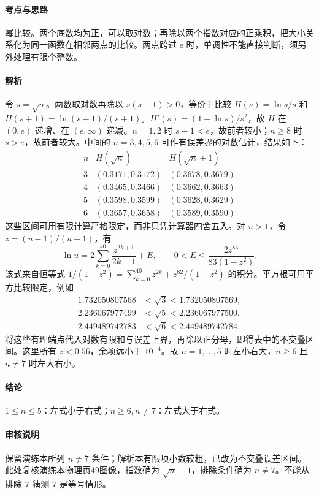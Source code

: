 \documentclass[UTF8,fontset=fandol,12pt,oneside,openany]{ctexrep}
\newcommand{\ee}{\mathrm e}
\theoremstyle{definition}
\begin{document}
\paragraph{考点与思路}
幂比较。两个底数均为正，可以取对数；再除以两个指数对应的正乘积，把大小关系化为同一函数在相邻两点的比较。两点跨过 $\ee$ 时，单调性不能直接判断，须另外处理有限个整数。
\paragraph{解析}
令 $s=\sqrt n$。两数取对数再除以 $s(s+1)>0$，等价于比较 $H(s)=\ln s/s$ 和 $H(s+1)=\ln(s+1)/(s+1)$。$H'(s)=(1-\ln s)/s^2$，故 $H$ 在 $(0,e)$ 递增、在 $(e,\infty)$ 递减。$n=1,2$ 时 $s+1<e$，故前者较小；$n\ge8$ 时 $s>e$，故前者较大。中间的 $n=3,4,5,6$ 可作有误差界的对数估计，结果如下：
\[\begin{array}{c|cc}n&H(\sqrt n)&H(\sqrt n+1)\\\hline3&(0.3171,0.3172)&(0.3678,0.3679)\\4&(0.3465,0.3466)&(0.3662,0.3663)\\5&(0.3598,0.3599)&(0.3628,0.3629)\\6&(0.3657,0.3658)&(0.3589,0.3590)\end{array}\]
这些区间可用有限计算严格限定，而非只凭计算器四舍五入。对 $u>1$，令 $z=(u-1)/(u+1)$，有
\[\ln u=2\sum_{k=0}^{40}\frac{z^{2k+1}}{2k+1}+E,\qquad
0<E\le\frac{2z^{83}}{83(1-z^2)}.\]
该式来自恒等式 $1/(1-z^2)=\sum_{k=0}^{40}z^{2k}+z^{82}/(1-z^2)$ 的积分。平方根可用平方比较限定，例如
\begin{align*}
1.732050807568&<\sqrt3<1.732050807569,\\
2.236067977499&<\sqrt5<2.236067977500,\\
2.449489742783&<\sqrt6<2.449489742784.
\end{align*}
将这些有理端点代入对数有限和与误差上界，再除以正分母，即得表中的不交叠区间。这里所有 $z<0.56$，余项远小于 $10^{-4}$。故 $n=1,\ldots,5$ 时左小右大，$n\ge6$ 且 $n\ne7$ 时左大右小。
\paragraph{结论}
$1\le n\le5$：左式小于右式；$n\ge6,n\ne7$：左式大于右式。
\paragraph{审核说明}
保留演练本所列 $n\ne7$ 条件；解析本有限项小数较粗，已改为不交叠误差区间。此处复核演练本物理页49图像，指数确为 $\sqrt n+1$，排除条件确为 $n\ne7$。不能从排除 $7$ 猜测 $7$ 是等号情形。
\end{document}

